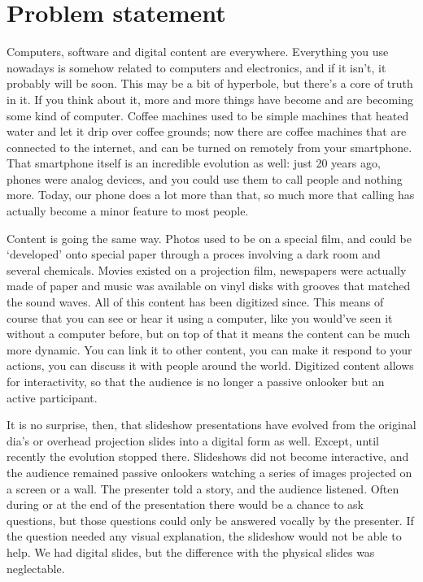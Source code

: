 
 \chapter{Problem statement}

  Computers, software and digital content are everywhere. Everything you use
  nowadays is somehow related to computers and electronics, and if it isn't, it
  probably will be soon. This may be a bit of hyperbole, but there's a core of
  truth in it. If you think about it, more and more things have become and are
  becoming some kind of computer. Coffee machines used to be simple machines
  that heated water and let it drip over coffee grounds; now there are coffee
  machines that are connected to the internet, and can be turned on remotely
  from your smartphone. That smartphone itself is an incredible evolution as
  well: just 20 years ago, phones were analog devices, and you could use them
  to call people and nothing more. Today, our phone does a lot more than that,
  so much more that calling has actually become a minor feature to most people.

  Content is going the same way. Photos used to be on a special film, and could
  be `developed' onto special paper through a proces involving a dark room and
  several chemicals. Movies existed on a projection film, newspapers were
  actually made of paper and music was available on vinyl disks with grooves
  that matched the sound waves. All of this content has been digitized since.
  This means of course that you can see or hear it using a computer, like you
  would've seen it without a computer before, but on top of that it means the
  content can be much more dynamic. You can link it to other content, you can
  make it respond to your actions, you can discuss it with people around the
  world. Digitized content allows for interactivity, so that the audience is no
  longer a passive onlooker but an active participant.

  It is no surprise, then, that slideshow presentations have evolved from the
  original dia's or overhead projection slides into a digital form as well.
  Except, until recently the evolution stopped there. Slideshows did not become
  interactive, and the audience remained passive onlookers watching a series of
  images projected on a screen or a wall. The presenter told a story, and the
  audience listened. Often during or at the end of the presentation there would
  be a chance to ask questions, but those questions could only be answered
  vocally by the presenter. If the question needed any visual explanation, the
  slideshow would not be able to help. We had digital slides, but the
  difference with the physical slides was neglectable.

